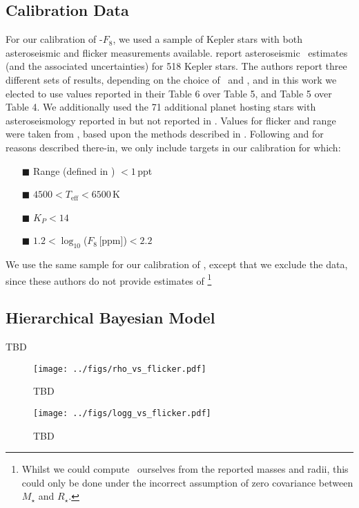 
\subsection{Calibration Data}

For our calibration of \rhostar-$F_8$, we used a sample of Kepler stars with
both asteroseismic and flicker measurements available. \citet{chaplin:2014}
report asteroseismic \rhostar\ estimates (and the associated uncertainties) for 
518 Kepler stars. The authors report three different sets of results, depending 
on the choice of \Teff\ and \FeH, and in this work we elected to use values 
reported in their Table 6 over Table 5, and Table 5 over Table 4. We 
additionally used the 71 additional planet hosting stars with asteroseismology 
reported in \citet{huber:2013} but not reported in \citet{chaplin:2014}. Values 
for flicker and range were taken from \citet{kipping:2014}, based upon the 
methods described in \citet{bastien:2013}. Following \citet{kipping:2014} and 
for reasons described there-in, we only include targets in our calibration for 
which:

\begin{itemize}
\item[{\tiny$\blacksquare$}] Range (defined in \citealt{bastien:2013}) 
$<1$\,ppt
\item[{\tiny$\blacksquare$}] $4500<T_{\mathrm{eff}}<6500$\,K
\item[{\tiny$\blacksquare$}] $K_P<14$
\item[{\tiny$\blacksquare$}] $1.2 < \log_{10}$($F_8$\,[ppm])$< 2.2$
\end{itemize}

We use the same sample for our calibration of \logg, except that we exclude the
\citet{huber:2013} data, since these authors do not provide estimates of
\logg\footnote{Whilst we could compute \logg\ ourselves from the reported
masses and radii, this could only be done under the incorrect assumption of
zero covariance between $M_{\star}$ and $R_{\star}$.}

\subsection{Hierarchical Bayesian Model}

TBD

\begin{figure}
\begin{center}
\texttt{[image: ../figs/rho\_vs\_flicker.pdf]}
\caption{
TBD
} 
\label{fig:rhostar}
\end{center}
\end{figure}

\begin{figure}
\begin{center}
\texttt{[image: ../figs/logg\_vs\_flicker.pdf]}
\caption{
TBD
} 
\label{fig:logg}
\end{center}
\end{figure}
